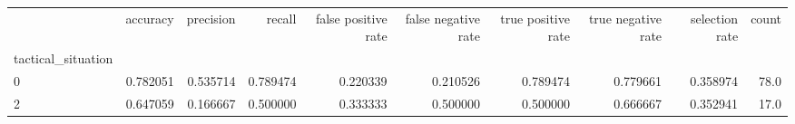 \begin{tabular}{lrrrrrrrrr}
\toprule
{} &  accuracy &  precision &    recall &  false positive rate &  false negative rate &  true positive rate &  true negative rate &  selection rate &  count \\
tactical\_situation &           &            &           &                      &                      &                     &                     &                 &        \\
\midrule
0                  &  0.782051 &   0.535714 &  0.789474 &             0.220339 &             0.210526 &            0.789474 &            0.779661 &        0.358974 &   78.0 \\
2                  &  0.647059 &   0.166667 &  0.500000 &             0.333333 &             0.500000 &            0.500000 &            0.666667 &        0.352941 &   17.0 \\
\bottomrule
\end{tabular}
